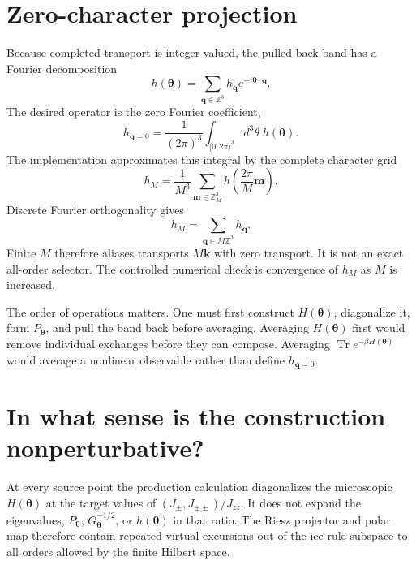 \documentclass[11pt]{article}
\newcommand{\Jzz}{J_{zz}}
\newcommand{\Jpm}{J_{\pm}}
\newcommand{\Jpp}{J_{\pm\pm}}
\newcommand{\bq}{\bm q}
\newcommand{\btheta}{\bm\theta}
\begin{document}
\section{Zero-character projection}

Because completed transport is integer valued, the pulled-back band has a
Fourier decomposition
\begin{equation}
 h(\btheta)=\sum_{\bq\in\mathbb Z^3}h_{\bq}e^{-i\btheta\cdot\bq}.
 \label{eq:exactfourier}
\end{equation}
The desired operator is the zero Fourier coefficient,
\begin{equation}
 h_{\bq=0}=\frac{1}{(2\pi)^3}\int_{[0,2\pi)^3}
 d^3\theta\;h(\btheta).
 \label{eq:continuousprojection}
\end{equation}
The implementation approximates this integral by the complete character grid
\begin{equation}
 h_M=\frac{1}{M^3}\sum_{\bm m\in\mathbb Z_M^3}
 h\!\left(\frac{2\pi}{M}\bm m\right).
 \label{eq:characterprojector}
\end{equation}
Discrete Fourier orthogonality gives
\begin{equation}
 h_M=\sum_{\bq\in M\mathbb Z^3}h_{\bq}.
 \label{eq:alias}
\end{equation}
Finite $M$ therefore aliases transports $M\bm k$ with zero transport.  It is
not an exact all-order selector.  The controlled numerical check is convergence
of $h_M$ as $M$ is increased.

The order of operations matters.  One must first construct $H(\btheta)$,
diagonalize it, form $P_{\btheta}$, and pull the band back before averaging.
Averaging $H(\btheta)$ first would remove individual exchanges before they can
compose.  Averaging $\operatorname{Tr}e^{-\beta H(\btheta)}$ would average a
nonlinear observable rather than define $h_{\bq=0}$.

\section{In what sense is the construction nonperturbative?}

At every source point the production calculation diagonalizes the microscopic
$H(\btheta)$ at the target values of $(\Jpm,\Jpp)/\Jzz$.  It does not expand the
eigenvalues, $P_{\btheta}$, $G_{\btheta}^{-1/2}$, or $h(\btheta)$ in that
ratio.  The Riesz projector and polar map therefore contain repeated virtual
excursions out of the ice-rule subspace to all orders allowed by the finite
Hilbert space.
\end{document}
